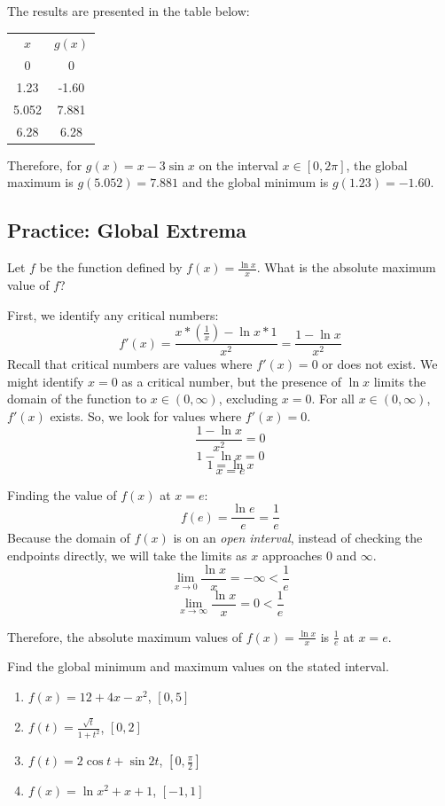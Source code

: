 The results are presented in the table below:

\begin{tabular}{c | c}
$x$ & $g(x)$\\
0 & 0\\
1.23 & -1.60\\
5.052 & 7.881\\
6.28 & 6.28\\
\end{tabular}

Therefore, for $g(x) = x-3\sin{x}$ on the interval $x \in [0, 2\pi]$, the 
global maximum is $g(5.052) = 7.881$ and the global minimum is $g(1.23) = 
-1.60$. 

\subsection{Practice: Global Extrema}
\begin{Exercise}[label=gloext1]
Let $f$ be the function defined by $f(x) = \frac{\ln{x}}{x}$. What is the 
absolute maximum value of $f$?
\end{Exercise}

\begin{Answer}[ref=gloext1]
First, we identify any critical numbers:
$$f'(x) = \frac{x*(\frac{1}{x})-\ln{x}*1}{x^2} = \frac{1-\ln{x}}{x^2}$$
Recall that critical numbers are values where $f'(x)=0$ or does not exist. 
We might identify $x=0$ as a critical number, but the presence of $\ln{x}$ 
limits the domain of the function to $x \in (0, \infty)$, excluding $x=0$. 
For all $x \in (0, \infty)$, $f'(x)$ exists. So, we look for values where 
$f'(x) = 0$.
$$\frac{1-\ln{x}}{x^2}=0$$
$$1-\ln{x}=0$$
$$1=\ln{x}$$
$$x=e$$

Finding the value of $f(x)$ at $x=e$: 
$$f(e) = \frac{\ln{e}}{e}=\frac{1}{e}$$
Because the domain of $f(x)$ is on an \textit{open interval}, instead of 
checking the endpoints directly, we will take the limits as $x$ approaches $0$ 
and $\infty$.
$$\lim_{x\to 0}\frac{\ln{x}}{x}=-\infty<\frac{1}{e}$$
$$\lim_{x \to \infty}\frac{\ln{x}}{x}=0<\frac{1}{e}$$

Therefore, the absolute maximum values of $f(x) = \frac{\ln{x}}{x}$ is $\frac{
1}{e}$ at $x=e$. 
\end{Answer}

\begin{Exercise}[label=gloext2]
Find the global minimum and maximum values on the stated interval.
\begin{enumerate}
	\item $f(x) = 12+4x-x^2$, $[0,5]$
	\item $f(t) = \frac{\sqrt{t}}{1+t^2}$, $[0, 2]$
	\item $f(t) = 2\cos{t} + \sin{2t}$, $[0, \frac{\pi}{2}]$
	\item $f(x) = \ln{x^2+x+1}$, $[-1, 1]$
\end{enumerate}
\end{Exercise}

